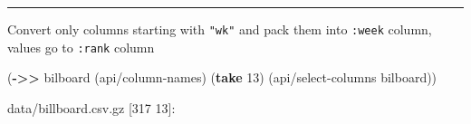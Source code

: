 \documentclass[]{article}
\newenvironment{Shaded}{\begin{snugshade}}{\end{snugshade}}
\newcommand{\KeywordTok}[1]{\textcolor[rgb]{0.13,0.29,0.53}{\textbf{#1}}}
\newcommand{\DecValTok}[1]{\textcolor[rgb]{0.00,0.00,0.81}{#1}}
\newcommand{\StringTok}[1]{\textcolor[rgb]{0.31,0.60,0.02}{#1}}
\newcommand{\CommentTok}[1]{\textcolor[rgb]{0.56,0.35,0.01}{\textit{#1}}}
\newcommand{\FunctionTok}[1]{\textcolor[rgb]{0.00,0.00,0.00}{#1}}
\newcommand{\VariableTok}[1]{\textcolor[rgb]{0.00,0.00,0.00}{#1}}
\newcommand{\BuiltInTok}[1]{#1}
\newcommand{\AttributeTok}[1]{\textcolor[rgb]{0.77,0.63,0.00}{#1}}
\newcommand{\NormalTok}[1]{#1}
\begin{document}
\begin{center}\rule{0.5\linewidth}{0.5pt}\end{center}

Convert only columns starting with \texttt{"wk"} and pack them into
\texttt{:week} column, values go to \texttt{:rank} column

\begin{Shaded}
\end{Shaded}

\begin{Shaded}
\begin{Highlighting}[]
\NormalTok{(}\KeywordTok{->>}\NormalTok{ bilboard}
\NormalTok{     (api/column-names)}
\NormalTok{     (}\KeywordTok{take} \DecValTok{13}\NormalTok{)}
\NormalTok{     (api/select-columns bilboard))}
\end{Highlighting}
\end{Shaded}

data/billboard.csv.gz {[}317 13{]}:
\end{document}
